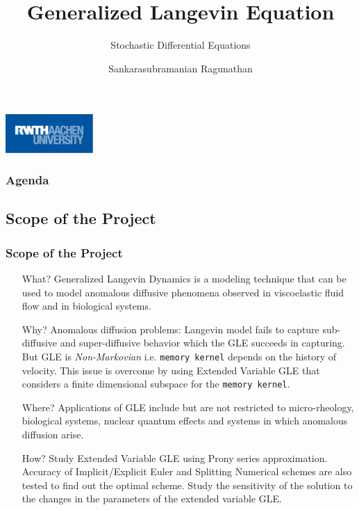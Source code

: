 \documentclass[a4paper,10pt]{beamer}
\title{Generalized Langevin Equation}
\subtitle{Stochastic Differential Equations}
\author{Sankarasubramanian Ragunathan \newline \newline 389851}
\institute{\textbf{RWTH Aachen University}}
\date{}
\begin{document}
	\begin{frame}
		\titlepage
		\centering
		\includegraphics[width=0.25\textwidth]{RWTH_Aachen_University_Logo.eps}
	\end{frame}

	\begin{frame}
	\frametitle{Agenda}
		\footnotesize
		\tableofcontents
	\end{frame}

	\begin{frame}
		\small
		\section{Scope of the Project}
		\frametitle{Scope of the Project}
		
		\begin{itemize}
			\item[What?]{Generalized Langevin Dynamics is a modeling technique that can be used to model anomalous diffusive phenomena observed in viscoelastic fluid flow and in biological systems.}
			
			\item[Why?]{Anomalous diffusion problems: Langevin model fails to capture sub-diffusive and super-diffusive behavior which the GLE succeeds in capturing. But GLE is \textit{Non-Markovian} i.e. \texttt{memory kernel} depends on the history of velocity. This issue is overcome by using Extended Variable GLE that considers a finite dimensional subspace for the \texttt{memory kernel}.}
			
			\item[Where?]{Applications of GLE include but are not restricted to micro-rheology, biological systems, nuclear quantum effects and systems in which anomalous diffusion arise.}
			
			\item[How?]{Study Extended Variable GLE using Prony series approximation. Accuracy of Implicit/Explicit Euler and Splitting Numerical schemes are also tested to find out the optimal scheme. Study the sensitivity of the solution to the changes in the parameters of the extended variable GLE.}
			
		\end{itemize}
	\end{frame}
\end{document}

